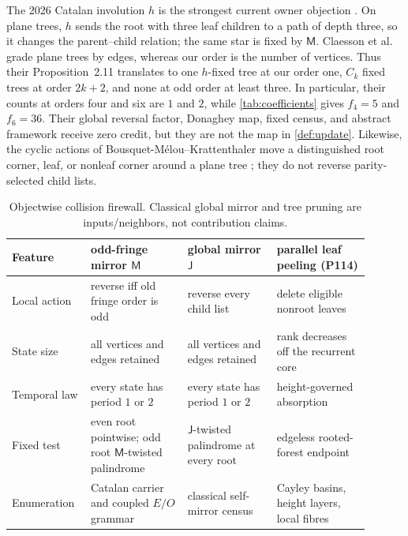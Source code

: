 \documentclass[10pt,a4paper]{amsart}
\theoremstyle{definition}
\theoremstyle{remark}
\newcommand{\M}{\mathsf M}
\newcommand{\J}{\mathsf J}
\begin{document}
The 2026 Catalan involution $h$ is the strongest current owner objection
\cite{ClaessonEtAl2026}.  On plane trees, $h$ sends the root with three leaf
children to a path of depth three, so it changes the parent--child relation;
the same star is fixed by $\M$.  Claesson et al. grade plane trees by edges,
whereas our order is the number of vertices.  Thus their Proposition~2.11
translates to one $h$-fixed tree at our order one, $C_k$ fixed trees at order
$2k+2$, and none at odd order at least three.  In particular, their counts
at orders four and six are $1$ and $2$, while
\cref{tab:coefficients} gives $f_4=5$ and $f_6=36$.  Their global reversal
factor, Donaghey map, fixed census, and abstract framework receive zero
credit, but they are not the map in \cref{def:update}.  Likewise, the
cyclic actions of Bousquet-Mélou--Krattenthaler move a distinguished root
corner, leaf, or nonleaf corner around a plane tree
\cite{BousquetMelouKrattenthaler2025}; they do not reverse parity-selected
child lists.

\begin{table}[H]
\centering
\small
\caption{Objectwise collision firewall.  Classical global mirror and tree
pruning are inputs/neighbors, not contribution claims.}
\label{tab:firewall}
\begin{tabular}{>{\raggedright\arraybackslash}p{0.18\linewidth}
                >{\raggedright\arraybackslash}p{0.25\linewidth}
                >{\raggedright\arraybackslash}p{0.23\linewidth}
                >{\raggedright\arraybackslash}p{0.24\linewidth}}
\toprule
Feature & odd-fringe mirror $\M$ & global mirror $\J$ & parallel leaf peeling (P114)\\
\midrule
Local action & reverse iff old fringe order is odd & reverse every child list & delete eligible nonroot leaves\\
State size & all vertices and edges retained & all vertices and edges retained & rank decreases off the recurrent core\\
Temporal law & every state has period $1$ or $2$ & every state has period $1$ or $2$ & height-governed absorption\\
Fixed test & even root pointwise; odd root $\M$-twisted palindrome & $\J$-twisted palindrome at every root & edgeless rooted-forest endpoint\\
Enumeration & Catalan carrier and coupled $E/O$ grammar & classical self-mirror census & Cayley basins, height layers, local fibres\\
\bottomrule
\end{tabular}
\end{table}
\end{document}
